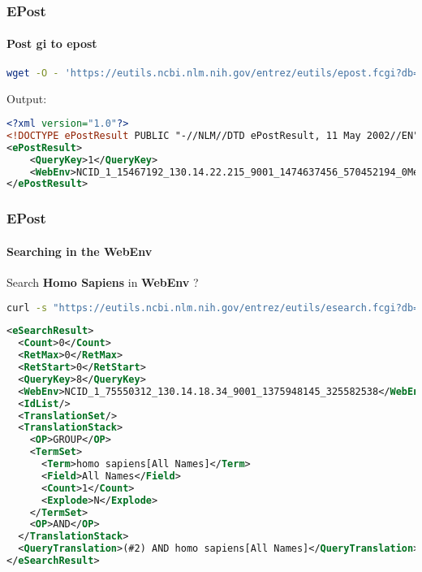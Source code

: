 \documentclass{beamer}
\begin{document}
\begin{frame}[fragile]
\frametitle{EPost}
\framesubtitle{Post gi to epost}
\begin{lstlisting}[language=bash,basicstyle=\tiny,breaklines=true,escapechar=\!]
wget -O - 'https://eutils.ncbi.nlm.nih.gov/entrez/eutils/epost.fcgi?db=taxonomy&WebEnd=NCID_1_15435144_130.14.22.215_9001_1474637318_669113391_0MetA0_S_MegaStore_F_1&id=1860150,1860149,1849957,1825730,1825729,1636722,1607772..."
\end{lstlisting}

Output:
\begin{lstlisting}[language=xml,basicstyle=\tiny,breaklines=true,escapechar=\%]
<?xml version="1.0"?>
<!DOCTYPE ePostResult PUBLIC "-//NLM//DTD ePostResult, 11 May 2002//EN" "http://www.ncbi.nlm.nih.gov/entrez/query/DTD/ePost_020511.dtd">
<ePostResult>
	<QueryKey>1</QueryKey>
	<WebEnv>NCID_1_15467192_130.14.22.215_9001_1474637456_570452194_0MetA0_S_MegaStore_F_1</WebEnv>
</ePostResult>
\end{lstlisting}
\end{frame}



\begin{frame}[fragile]
\frametitle{EPost}
\framesubtitle{Searching in the WebEnv}
Search {\bf Homo Sapiens} in {\bf WebEnv} ?

\begin{lstlisting}[language=bash,basicstyle=\tiny,breaklines=true,escapechar=\!]
curl -s "https://eutils.ncbi.nlm.nih.gov/entrez/eutils/esearch.fcgi?db=taxonomy&term=!\color{red}{Homo\%20Sapiens}!&usehistory=y&WebEnv=NCID_1_75550312_130.14.18.34_9001_1375948145_325582538&query_key=1"
\end{lstlisting}

\begin{lstlisting}[language=xml,basicstyle=\tiny,breaklines=true,escapechar=\%]
<eSearchResult>
  <Count>0</Count>
  <RetMax>0</RetMax>
  <RetStart>0</RetStart>
  <QueryKey>8</QueryKey>
  <WebEnv>NCID_1_75550312_130.14.18.34_9001_1375948145_325582538</WebEnv>
  <IdList/>
  <TranslationSet/>
  <TranslationStack>
    <OP>GROUP</OP>
    <TermSet>
      <Term>homo sapiens[All Names]</Term>
      <Field>All Names</Field>
      <Count>1</Count>
      <Explode>N</Explode>
    </TermSet>
    <OP>AND</OP>
  </TranslationStack>
  <QueryTranslation>(#2) AND homo sapiens[All Names]</QueryTranslation>
</eSearchResult>
\end{lstlisting}

\end{frame}
\end{document}
